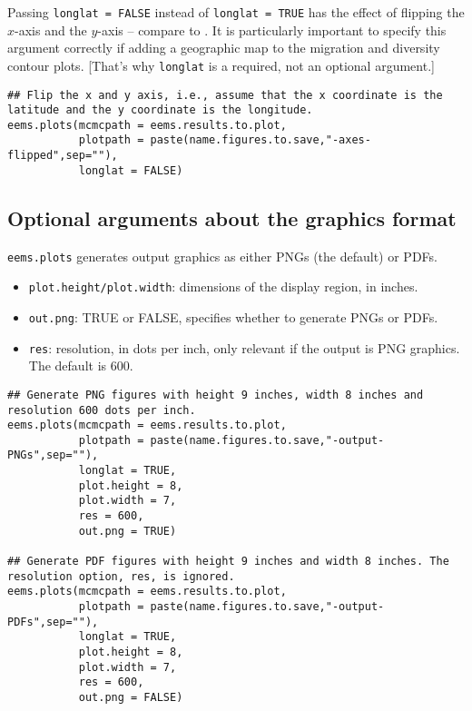 \documentclass[a4paper,10pt,DIV=15,titlepage,mpinclude=true]{scrartcl}
\newcommand{\keystring}[1]{{\tt #1}}
\begin{document}
Passing \keystring{longlat = FALSE} instead of \keystring{longlat = TRUE} has the effect of flipping the $x$-axis and the $y$-axis -- compare  to . It is particularly important to specify this argument correctly if adding a geographic map to the migration and diversity contour plots. [That's why \keystring{longlat} is a required, not an optional argument.]

\begin{lstlisting}[style=Rcode]
## Flip the x and y axis, i.e., assume that the x coordinate is the latitude and the y coordinate is the longitude.
eems.plots(mcmcpath = eems.results.to.plot,
           plotpath = paste(name.figures.to.save,"-axes-flipped",sep=""),
           longlat = FALSE)
\end{lstlisting}

\subsection{Optional arguments about the graphics format}

\keystring{eems.plots} generates output graphics as either PNGs (the default) or PDFs.

\begin{itemize}
  \item \keystring{plot.height/plot.width}: dimensions of the display region, in inches.
  \item \keystring{out.png}: TRUE or FALSE, specifies whether to generate PNGs or PDFs.
  \item \keystring{res}: resolution, in dots per inch, only relevant if the output is PNG graphics. The default is 600.
\end{itemize}

\begin{lstlisting}[style=Rcode]
## Generate PNG figures with height 9 inches, width 8 inches and resolution 600 dots per inch.
eems.plots(mcmcpath = eems.results.to.plot,
           plotpath = paste(name.figures.to.save,"-output-PNGs",sep=""),
           longlat = TRUE,
           plot.height = 8,
           plot.width = 7,
           res = 600,
           out.png = TRUE)

## Generate PDF figures with height 9 inches and width 8 inches. The resolution option, res, is ignored.
eems.plots(mcmcpath = eems.results.to.plot,
           plotpath = paste(name.figures.to.save,"-output-PDFs",sep=""),
           longlat = TRUE,
           plot.height = 8,
           plot.width = 7,
           res = 600,
           out.png = FALSE)
\end{lstlisting}
\end{document}
